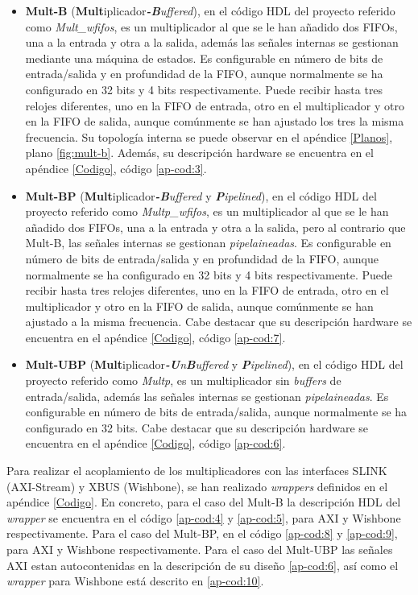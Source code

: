 \begin{itemize}
    \item \textbf{Mult-B} (\textbf{Mult}iplicador\textit{\textbf{-B}uffered}), en el código HDL del proyecto referido como \textit{Mult\_wfifos}, es un multiplicador al que se le han añadido dos FIFOs, una a la entrada y otra a la salida, además las señales internas se gestionan mediante una máquina de estados. 
Es configurable en número de bits de entrada/salida y en profundidad de la FIFO, aunque normalmente se ha configurado en 32 bits y 4 bits respectivamente.
Puede recibir hasta tres relojes diferentes, uno en la FIFO de entrada, otro en el multiplicador y otro en la FIFO de salida, aunque comúnmente se han ajustado los tres la misma frecuencia.
Su topología interna se puede observar en el apéndice \ref{Planos}, plano \ref{fig:mult-b}.
Además, su descripción hardware se encuentra en el apéndice \ref{Codigo}, código \ref{ap-cod:3}.
\item \textbf{Mult-BP} (\textbf{Mult}iplicador\textit{\textbf{-B}uffered} y \textit{\textbf{P}ipelined}), en el código HDL del proyecto referido como \textit{Multp\_wfifos}, es un multiplicador al que se le han añadido dos FIFOs, una a la entrada y otra a la salida, pero al contrario que Mult-B, las señales internas se gestionan \textit{pipelaineadas}.
Es configurable en número de bits de entrada/salida y en profundidad de la FIFO, aunque normalmente se ha configurado en 32 bits y 4 bits respectivamente.
Puede recibir hasta tres relojes diferentes, uno en la FIFO de entrada, otro en el multiplicador y otro en la FIFO de salida, aunque comúnmente se han ajustado a la misma frecuencia.
Cabe destacar que su descripción hardware se encuentra en el apéndice \ref{Codigo}, código \ref{ap-cod:7}.
\item \textbf{Mult-UBP} (\textbf{Mult}iplicador\textit{\textbf{-U}n\textbf{B}uffered} y \textit{\textbf{P}ipelined}), en el código HDL del proyecto referido como \textit{Multp}, es un multiplicador sin \textit{buffers} de entrada/salida, además las señales internas se gestionan \textit{pipelaineadas}.
Es configurable en número de bits de entrada/salida, aunque normalmente se ha configurado en 32 bits.
Cabe destacar que su descripción hardware se encuentra en el apéndice \ref{Codigo}, código \ref{ap-cod:6}.
\end{itemize}

Para realizar el acoplamiento de los multiplicadores con las interfaces SLINK (AXI-Stream) y XBUS (Wishbone), se han realizado \textit{wrappers} definidos en el apéndice \ref{Codigo}.
En concreto, para el caso del Mult-B la descripción HDL del \textit{wrapper} se encuentra en el código \ref{ap-cod:4} y \ref{ap-cod:5}, para AXI y Wishbone respectivamente.
Para el caso del Mult-BP, en el código \ref{ap-cod:8} y \ref{ap-cod:9}, para AXI y Wishbone respectivamente.
Para el caso del Mult-UBP las señales AXI estan autocontenidas en la descripción de su diseño \ref{ap-cod:6}, así como el \textit{wrapper} para Wishbone está descrito en \ref{ap-cod:10}.

